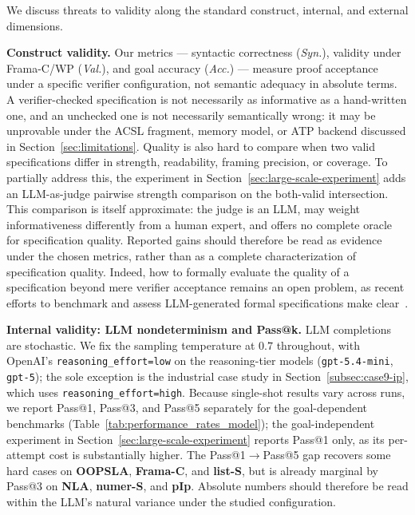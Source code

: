 \label{sec:threats}

We discuss threats to validity along the standard construct, internal, and
external dimensions.

\smallskip
\noindent\textbf{Construct validity.}
Our metrics --- syntactic correctness (\emph{Syn.}), validity under Frama-C/WP
(\emph{Val.}), and goal accuracy (\emph{Acc.}) --- measure proof acceptance
under a specific verifier configuration, not semantic adequacy in absolute
terms. A verifier-checked specification is not necessarily as informative as a
hand-written one, and an unchecked one is not necessarily semantically wrong: it
may be unprovable under the ACSL fragment, memory model, or ATP backend
discussed in Section~\ref{sec:limitations}. Quality is also hard to compare when
two valid specifications differ in strength, readability, framing precision, or
coverage. To partially address this, the experiment in
Section~\ref{sec:large-scale-experiment} adds an LLM-as-judge pairwise strength
comparison on the both-valid intersection. This comparison is itself
approximate: the judge is an LLM, may weight informativeness differently from a
human expert, and offers no complete oracle for specification quality. Reported
gains should therefore be read as evidence under the chosen metrics, rather than
as a complete characterization of specification quality. Indeed, how to
formally evaluate the quality of a specification beyond mere verifier
acceptance remains an open problem, as recent efforts to benchmark and assess
LLM-generated formal specifications make
clear~\cite{yang2026how,thakur2025clever}.

\smallskip
\noindent\textbf{Internal validity: LLM nondeterminism and Pass@k.}
LLM completions are stochastic. We fix the sampling temperature at $0.7$
throughout, with OpenAI's \texttt{reasoning\_effort=low} on the reasoning-tier
models (\texttt{gpt-5.4-mini}, \texttt{gpt-5}); the sole exception is the
industrial case study in Section~\ref{subsec:case9-ip}, which uses
\texttt{reasoning\_effort=high}.
Because single-shot results vary across runs, we report Pass@1,
Pass@3, and Pass@5 separately for the goal-dependent benchmarks
(Table~\ref{tab:performance_rates_model}); the goal-independent
experiment in Section~\ref{sec:large-scale-experiment} reports Pass@1 only, as
its per-attempt cost is substantially higher. The Pass@1$\to$Pass@5 gap recovers
some hard cases on \textbf{OOPSLA}, \textbf{Frama-C}, and \textbf{list-S}, but is
already marginal by Pass@3 on \textbf{NLA}, \textbf{numer-S}, and \textbf{pIp}.
Absolute numbers
should therefore be read within the LLM's natural variance under the studied
configuration.

